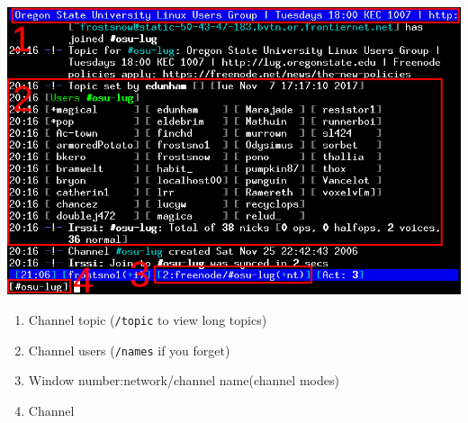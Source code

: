 \documentclass{beamer}
\begin{document}
\begin{frame}
	\includegraphics[scale=1.5]{join.png}
	\begin{enumerate}
		\item Channel topic (\texttt{/topic} to view long topics)
		\item Channel users (\texttt{/names} if you forget)
		\item Window number:network/channel name(channel modes)
		\item Channel
	\end{enumerate}
\end{frame}
\end{document}

